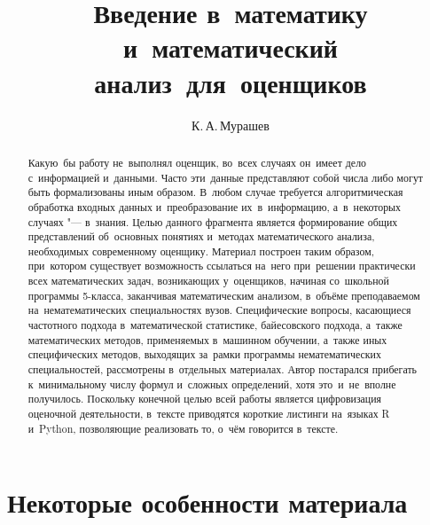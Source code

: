 \documentclass[]{scrartcl}
\title{Введение в~математику и~математический анализ~для~оценщиков}
\author{К.\,А.\,Мурашев}
\begin{document}
\maketitle

\begin{abstract}
	Какую~бы работу не~выполнял оценщик, во~всех случаях он~имеет дело с~информацией и~данными. Часто эти~данные представляют собой числа либо могут быть формализованы иным образом. В~любом случае требуется алгоритмическая обработка входных данных и~преобразование их~в~информацию, а~в~некоторых случаях "--- в~знания. Целью данного фрагмента является формирование общих представлений об~основных понятиях и~методах математического анализа, необходимых современному оценщику. Материал построен таким образом, при~котором существует возможность ссылаться на~него при~решении практически всех математических задач, возникающих у~оценщиков, начиная со~школьной программы 5-класса, заканчивая математическим анализом, в~объёме преподаваемом на~нематематических специальностях вузов. Специфические вопросы, касающиеся частотного подхода в~математической статистике, байесовского подхода, а~также математических методов, применяемых в~машинном обучении, а~также иных специфических методов, выходящих за~рамки программы нематематических специальностей, рассмотрены в~отдельных материалах.  Автор постарался прибегать к~минимальному числу формул и~сложных определений, хотя это~и~не~вполне получилось. Поскольку конечной целью всей работы является цифровизация оценочной деятельности, в~тексте приводятся короткие листинги на~языках R и~Python, позволяющие реализовать то, о~чём говорится в~тексте. 
\end{abstract}

\tableofcontents
\section{Некоторые особенности материала}
\end{document}
